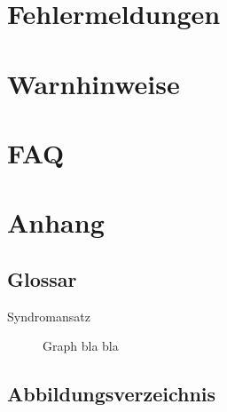 \documentclass[enabledeprecatedfontcommands,fontsize=11pt,paper=a4,twoside]{scrartcl}
\begin{document}
	\section{Fehlermeldungen} \label{fehlermeldungen}
	
	
\section{Warnhinweise} \label{sec:warnhinweise}
	
	
	
	
\section{FAQ}
\newpage
\section{Anhang} \label{sec:anhang}	
	\subsection{Glossar}
	
	\begin{description}
		\item[Syndromansatz] Graph bla bla
	\end{description}
	
	\subsection{Abbildungsverzeichnis}
	\listoffigures
	

\newpage



\end{document}
